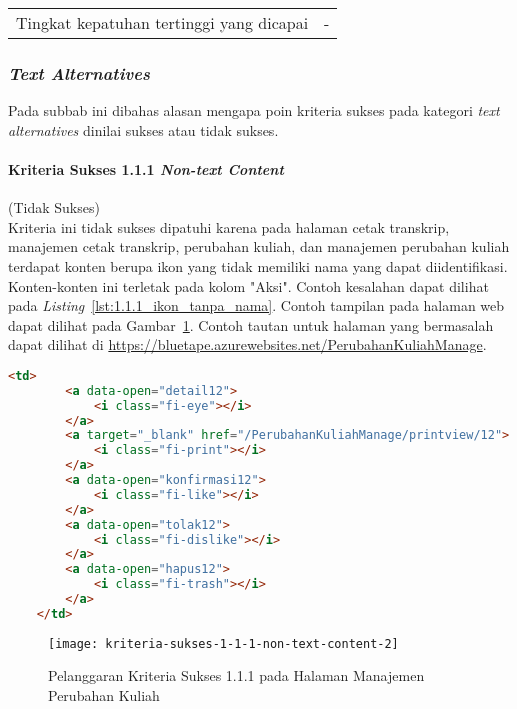 \begin{center}
\begin{longtable}{|c|c|c|}
    \hline
    \multicolumn{2}{|c|}{Tingkat kepatuhan tertinggi yang dicapai} & - \\

\end{longtable}
\end{center}

\subsubsection{\textit{Text Alternatives}}
\label{subsubsec:kepatuhan_bluetape_text_alternatives}
Pada subbab ini dibahas alasan mengapa poin kriteria sukses pada kategori \textit{text alternatives} dinilai sukses atau tidak sukses.

\paragraph{Kriteria Sukses 1.1.1 \textit{Non-text Content}}
\label{par:kepatuhan_bluetape_kriteria_sukses_1.1.1}
(Tidak Sukses)\\

Kriteria ini tidak sukses dipatuhi karena pada halaman cetak transkrip, manajemen cetak transkrip, perubahan kuliah, dan manajemen perubahan kuliah terdapat konten berupa ikon yang tidak memiliki nama yang dapat diidentifikasi. Konten-konten ini terletak pada kolom "Aksi". Contoh kesalahan dapat dilihat pada \mbox{\textit{Listing} \ref{lst:1.1.1_ikon_tanpa_nama}}. Contoh tampilan pada halaman web dapat dilihat pada \mbox{Gambar \ref{fig:1.1.1_non_text_content_2}}. Contoh tautan untuk halaman yang bermasalah dapat dilihat di \url{https://bluetape.azurewebsites.net/PerubahanKuliahManage}.
\begin{lstlisting}[frame=single, label={lst:1.1.1_ikon_tanpa_nama}, language=HTML, caption=Pelanggaran Kriteria Sukses 1.1.1 pada Halaman Manajemen Perubahan Kuliah]
    <td>
        <a data-open="detail12">
            <i class="fi-eye"></i>
        </a>
        <a target="_blank" href="/PerubahanKuliahManage/printview/12">
            <i class="fi-print"></i>
        </a>
        <a data-open="konfirmasi12">
            <i class="fi-like"></i>
        </a>  
        <a data-open="tolak12">
            <i class="fi-dislike"></i>
        </a>
        <a data-open="hapus12">
            <i class="fi-trash"></i>
        </a>
    </td>
\end{lstlisting}

\begin{figure}[H]
    \centering  
    \texttt{[image: kriteria-sukses-1-1-1-non-text-content-2]}  
    \caption[Pelanggaran Kriteria Sukses 1.1.1 pada Halaman Manajemen Perubahan Kuliah]{Pelanggaran Kriteria Sukses 1.1.1 pada Halaman Manajemen Perubahan Kuliah}
    \label{fig:1.1.1_non_text_content_2}  
\end{figure} 

